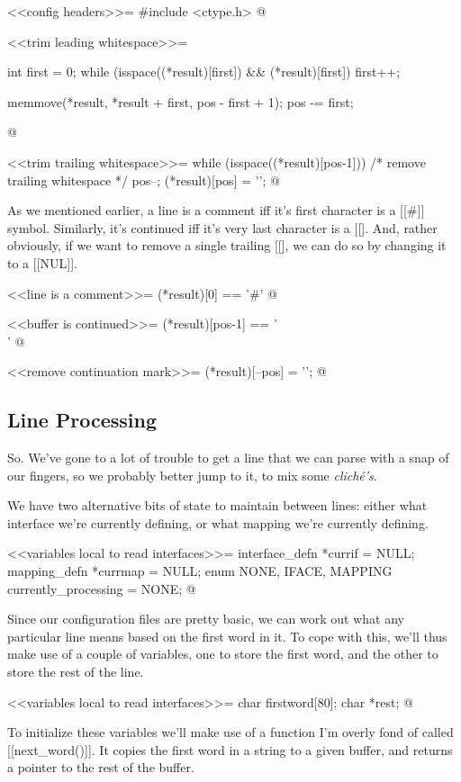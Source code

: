 \documentclass{article}
\begin{document}
<<config headers>>=
#include <ctype.h>
@ 

<<trim leading whitespace>>=
{ 
	int first = 0; 
	while (isspace((*result)[first]) && (*result)[first]) {
		first++;
	}

	memmove(*result, *result + first, pos - first + 1);
	pos -= first;
}
@ 

<<trim trailing whitespace>>=
while (isspace((*result)[pos-1])) { /* remove trailing whitespace */
	pos--;
}
(*result)[pos] = '\0';
@ 

As we mentioned earlier, a line is a comment iff it's first character
is a [[#]] symbol. Similarly, it's continued iff it's very last
character is a [[\]]. And, rather obviously, if we want to remove a
single trailing [[\]], we can do so by changing it to a [[NUL]].

<<line is a comment>>=
(*result)[0] == '#'
@ 

<<buffer is continued>>=
(*result)[pos-1] == '\\'
@ 

<<remove continuation mark>>=
(*result)[--pos] = '\0';
@ 

\subsection{Line Processing}

So. We've gone to a lot of trouble to get a line that we can parse
with a snap of our fingers, so we probably better jump to it, to mix
some \emph{clich\'e's}.

We have two alternative bits of state to maintain between lines: either
what interface we're currently defining, or what mapping we're currently
defining.

<<variables local to read interfaces>>=
interface_defn *currif = NULL;
mapping_defn *currmap = NULL;
enum { NONE, IFACE, MAPPING } currently_processing = NONE;
@ 

Since our configuration files are pretty basic, we can work out what
any particular line means based on the first word in it. To cope with
this, we'll thus make use of a couple of variables, one to store the
first word, and the other to store the rest of the line.

<<variables local to read interfaces>>=
char firstword[80];
char *rest;
@ 

To initialize these variables we'll make use of a function I'm overly
fond of called [[next_word()]]. It copies the first word in a string
to a given buffer, and returns a pointer to the rest of the buffer.
\end{document}
